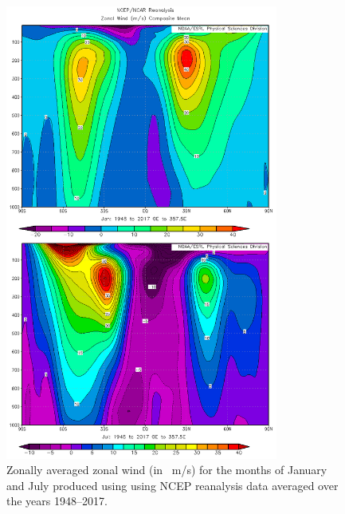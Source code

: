 \documentclass[11pt]{article}
\begin{document}
\begin{figure}[h!]
  \centering
  \includegraphics[width=0.8\textwidth]{zonal_wind_janjul.png}
  \caption{Zonally averaged zonal wind (in \SI{}{\m/\s}) for the months of January and July produced using using NCEP reanalysis data averaged over the years 1948--2017.}
  \label{fig:zonal_wind}
\end{figure}
\end{document}
